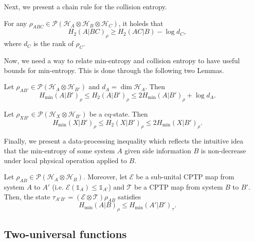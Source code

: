 
Next, we present a chain rule for the collision entropy.

\begin{lemma}
For any $\rho_{ABC}\in\mathcal{P}(\mathcal{H}_A\otimes\mathcal{H}_B\otimes\mathcal{H}_C)$, it holeds that
$$H_2(A|BC)_{\rho} \geq H_2(AC|B) - \log d_C,$$
where $d_C$ is the rank of $\rho_C$.
\label{lemma:chain_rule}
\end{lemma}

Now, we need a way to relate min-entropy and collision entropy to have useful bounds for min-entropy. This is done through the following two Lemmas.

\begin{lemma}
\label{lemma:quantumrelation}
Let $\rho_{A B'}\in\mathcal{P}(\mathcal{H}_A \otimes \mathcal{H}_{B'})$ and $d_A = \dim\mathcal{H}_A$. Then
$$H_{\min}(A|B')_{\rho} \leq H_2(A|B')_{\rho} \leq 2 H_{\min}(A|B')_{\rho} + \log d_A.$$
\end{lemma}

\begin{lemma}
\label{lemma:classicalquantumrelation}
Let $\rho_{X B'}\in\mathcal{P}(\mathcal{H}_X \otimes \mathcal{H}_{B'})$ be a cq-state. Then
$$H_{\min}(X|B')_{\rho} \leq H_2(X|B')_{\rho} \leq 2 H_{\min}(X|B')_{\rho}.$$
\end{lemma}

Finally, we present a data-processing inequality which reflects the intuitive idea that the min-entropy of some system $A$ given side information $B$ is non-decrease under local physical operation applied to $B$. 

\begin{lemma}
\label{lemma:data_processing_inequality}
Let $\rho_{A B}\in\mathcal{P}(\mathcal{H}_A \otimes \mathcal{H}_{B})$. Moreover, let $\mathcal{E}$ be a sub-unital CPTP map from system $A$ to $A'$ (i.e. $\mathcal{E}(\mathds{1}_A) \leq \mathds{1}_{A'}$) and $\mathcal{T}$ be a CPTP map from system $B$ to $B'$. Then, the state $\tau_{A' B'} = \left(\mathcal{E}\otimes \mathcal{T}  \right)\rho_{AB}$ satisfies
$$H_{\min}(A|B)_{\rho}\leq H_{\min}(A'|B')_{\tau}.$$
\end{lemma}

\subsection{Two-universal functions}

